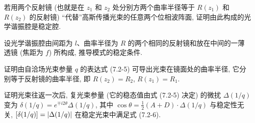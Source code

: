 \documentclass{note}
\begin{document}
\begin{exe}
    若用两个反射镜 (也就是在 $z_1$ 和 $z_2$ 处分别方两个曲率半径等于 $R(z_1)$ 和 $R(z_2)$ 的反射镜) ``代替''高斯传播光束的任意两个位相波阵面, 证明由此构成的光学谐振腔是稳定腔.
\end{exe}
\begin{pf}
    
\end{pf}

\begin{exe}
    设光学谐振腔由间距为 $l$、曲率半径为 $R$ 的两个相同的反射镜和放在中间的一薄透镜 (焦距为 $f$) 所构成, 推导模式的稳定条件.
\end{exe}
\begin{sol}
    
\end{sol}

\begin{exe}
    证明由自洽场光束参量 $q$ 的表达式 (7.2-5) 可导出光束在镜面处的曲率半径, 它分别等于反射镜的曲率半径, 即 $R(z_2)=R_2$, $R(z_1)=R_1$.
\end{exe}
\begin{pf}
    
\end{pf}

\begin{exe}
    证明光束往返一次后, 复光束参量 (它的稳态值由式 (7.2-5) 决定) 的微扰 $\Delta(1/q)$ 变为 $\delta(1/q)=e^{\mp i2\theta}\Delta(1/q)$, 其中 $\cos\theta=\frac{1}{2}(A+D)\cdot\Delta(1/q)$ 与稳定性无关, $[\delta(1/q)]=\left\lvert\Delta(1/q)\right\rvert$ 在稳定光束中满足式 (7.2-6).
\end{exe}
\begin{pf}
    
\end{pf}
\ifx\allfiles\undefined
\end{document}
